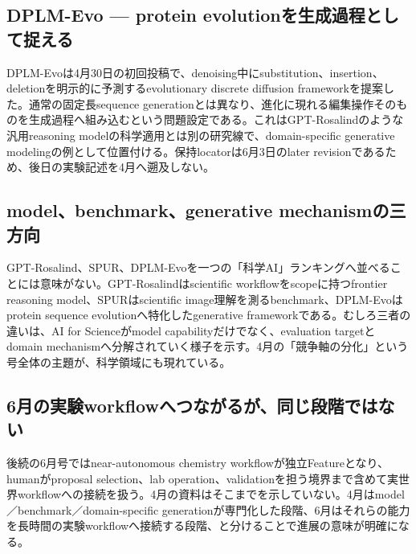 \subsection{DPLM-Evo — protein evolutionを生成過程として捉える}

DPLM-Evoは4月30日の初回投稿で、denoising中にsubstitution、insertion、deletionを明示的に予測するevolutionary discrete diffusion frameworkを提案した。通常の固定長sequence generationとは異なり、進化に現れる編集操作そのものを生成過程へ組み込むという問題設定である。これはGPT-Rosalindのような汎用reasoning modelの科学適用とは別の研究線で、domain-specific generative modelingの例として位置付ける。保持locatorは6月3日のlater revisionであるため、後日の実験記述を4月へ遡及しない。\autocite{src-f0bb84fcd319}


\subsection{model、benchmark、generative mechanismの三方向}

GPT-Rosalind、SPUR、DPLM-Evoを一つの「科学AI」ランキングへ並べることには意味がない。GPT-Rosalindはscientific workflowをscopeに持つfrontier reasoning model、SPURはscientific image理解を測るbenchmark、DPLM-Evoはprotein sequence evolutionへ特化したgenerative frameworkである。むしろ三者の違いは、AI for Scienceがmodel capabilityだけでなく、evaluation targetとdomain mechanismへ分解されていく様子を示す。4月の「競争軸の分化」という号全体の主題が、科学領域にも現れている。\autocite{src-078f0d540d88,src-7ae707d75c4b,src-f0bb84fcd319}


\subsection{6月の実験workflowへつながるが、同じ段階ではない}

後続の6月号ではnear-autonomous chemistry workflowが独立Featureとなり、humanがproposal selection、lab operation、validationを担う境界まで含めて実世界workflowへの接続を扱う。4月の資料はそこまでを示していない。4月はmodel／benchmark／domain-specific generationが専門化した段階、6月はそれらの能力を長時間の実験workflowへ接続する段階、と分けることで進展の意味が明確になる。\autocite{src-078f0d540d88,src-7ae707d75c4b,src-f0bb84fcd319}


